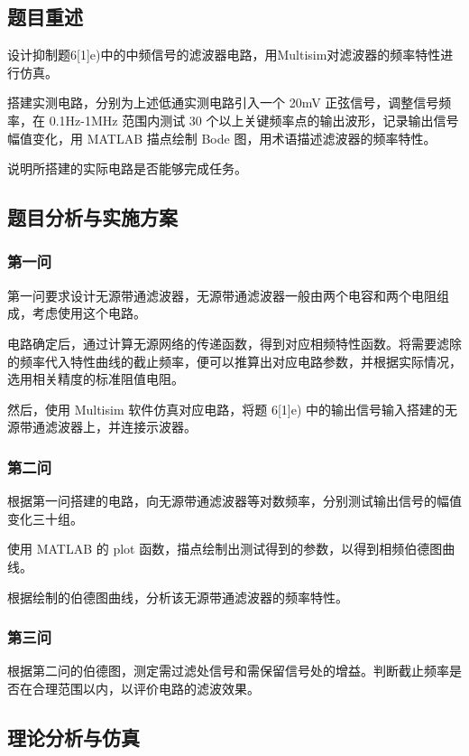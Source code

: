 \documentclass[./测控三级项目.tex]{subfiles} %
\begin{document}
	\subsection{题目重述}
		\begin{compactenum}
			\item 设计抑制题6[1]e)中的中频信号的滤波器电路，用Multisim对滤波器的频率特性进行仿真。
			\item 搭建实测电路，分别为上述低通实测电路引入一个 20mV 正弦信号，调整信号频率，在 0.1Hz-1MHz 范围内测试 30 个以上关键频率点的输出波形，记录输出信号幅值变化，用 MATLAB 描点绘制 Bode 图，用术语描述滤波器的频率特性。
			\item 说明所搭建的实际电路是否能够完成任务。
		\end{compactenum}
	\subsection{题目分析与实施方案}
		\subsubsection{第一问}
			第一问要求设计无源带通滤波器，无源带通滤波器一般由两个电容和两个电阻组成，考虑使用这个电路。\par
			电路确定后，通过计算无源网络的传递函数，得到对应相频特性函数。将需要滤除的频率代入特性曲线的截止频率，便可以推算出对应电路参数，并根据实际情况，选用相关精度的标准阻值电阻。 \par
			然后，使用 Multisim 软件仿真对应电路，将题 6[1]e) 中的输出信号输入搭建的无源带通滤波器上，并连接示波器。
		\subsubsection{第二问}
			根据第一问搭建的电路，向无源带通滤波器等对数频率，分别测试输出信号的幅值变化三十组。\par 
			使用 MATLAB 的 plot 函数，描点绘制出测试得到的参数，以得到相频伯德图曲线。\par 
			根据绘制的伯德图曲线，分析该无源带通滤波器的频率特性。
		\subsubsection{第三问}
			根据第二问的伯德图，测定需过滤处信号和需保留信号处的增益。判断截止频率是否在合理范围以内，以评价电路的滤波效果。
	
	\subsection{理论分析与仿真}
\end{document}
